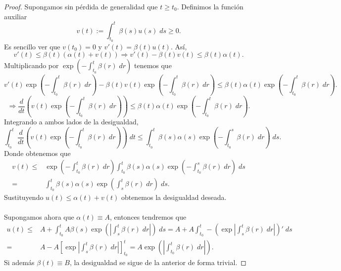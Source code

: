 \begin{proof}
Supongamos sin pérdida de generalidad que $\displaystyle t \geq t_{0} $. Definimos la función auxiliar
\[v\left(t\right):=\int^{t}_{t_{0}} \beta\left(s\right)u\left(s\right) \; d s \geq 0.\]
Es sencillo ver que $\displaystyle v\left(t_{0}\right)=0 $ y $\displaystyle v'\left(t\right)=\beta\left(t\right)u\left(t\right) $. Así, 
\[v'\left(t\right)\leq \beta\left(t\right)\left(\alpha\left(t\right)+v\left(t\right)\right) \Rightarrow v'\left(t\right)-\beta\left(t\right)v\left(t\right)\leq \beta\left(t\right)\alpha\left(t\right) .\]
Multiplicando por $\displaystyle \exp\left(-\int^{t}_{t_{0}} \beta\left(r\right) \; dr\right) $ tenemos que 
\[v'\left(t\right)\exp\left(-\int^{t}_{t_{0}} \beta\left(r\right) \; dr\right)-\beta\left(t\right)v\left(t\right)\exp\left(-\int^{t}_{t_{0}} \beta\left(r\right) \; dr\right)\leq \beta\left(t\right)\alpha\left(t\right)\exp\left(-\int^{t}_{t_{0}} \beta\left(r\right) \; dr\right) .\]
\[\Rightarrow \frac{d}{dt}\left(v\left(t\right)\exp\left(-\int^{t}_{t_{0}} \beta\left(r\right) \; dr\right)\right)\leq \beta\left(t\right)\alpha\left(t\right)\exp\left(-\int^{t}_{t_{0}} \beta\left(r\right) \; dr\right) .\]
Integrando a ambos lados de la desigualdad,
\[\int^{t}_{t_{0}} \frac{d}{dt}\left(v\left(t\right)\exp\left(-\int^{t}_{t_{0}} \beta\left(r\right) \; dr\right)\right) \; dt \leq \int^{t}_{t_{0}} \beta\left(s\right)\alpha\left(s\right)\exp\left(-\int^{s}_{t_{0}} \beta\left(r\right) \; dr\right) \; d s .\]
Donde obtenemos que 
\[
\begin{split}
	v\left(t\right)\leq & \exp\left(-\int^{t}_{t_{0}} \beta\left(r\right) \; dr\right)\int^{t}_{t_{0}} \beta\left(s\right)\alpha\left(s\right)\exp\left(-\int^{s}_{t_{0}} \beta\left(r\right) \; dr\right) \; d s \\
	= &  \int^{t}_{t_{0}} \beta\left(s\right)\alpha\left(s\right)\exp\left(\int^{t}_{s} \beta\left(r\right) \; dr\right) \; d s.
\end{split}
\]
Sustituyendo $\displaystyle u\left(t\right)\leq \alpha\left(t\right) + v\left(t\right) $ obtenemos la desigualdad deseada. \\ \\
Supongamos ahora que $\displaystyle \alpha\left(t\right)\equiv A $, entonces tendremos que 
\[
\begin{split}
	u\left(t\right)\leq & A + \int^{t}_{t_{0}} A\beta\left(s\right)\exp\left(\left|\int^{t}_{s} \beta\left(r\right) \; dr\right|\right) \; d s = A + A\int^{t}_{t_{0}} - \left(\exp \left|\int^{t}_{s} \beta\left(r\right) \; dr\right|\right)' \; d s \\
	= & A - A \left[\exp \left|\int^{t}_{s} \beta\left(r\right) \; dr\right|\right] ^{t}_{t_{0}} =  A \exp\left( \left|\int^{t}_{t_{0}} \beta\left(r\right) \; dr\right|\right) .
\end{split}
\]
Si además $\displaystyle \beta\left(t\right)\equiv B $, la desigualdad se sigue de la anterior de forma trivial.
\end{proof}
